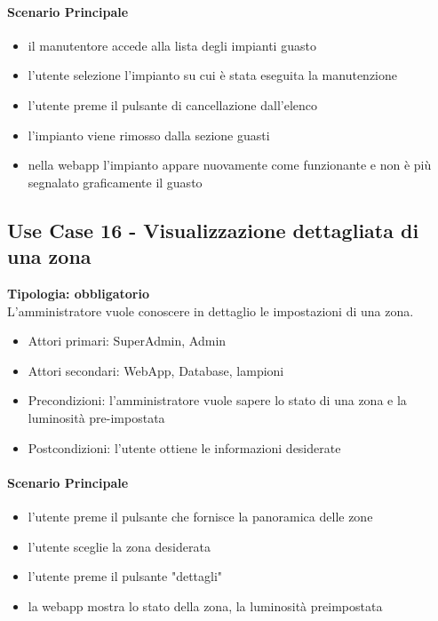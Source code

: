 \documentclass[12pt]{article}
\begin{document}
\paragraph{Scenario Principale}
\begin{itemize}
	\item il manutentore accede alla lista degli impianti guasto
	\item l'utente selezione l'impianto su cui è stata eseguita la manutenzione
	\item l'utente preme il pulsante di cancellazione dall'elenco
	\item l'impianto viene rimosso dalla sezione guasti
	\item nella webapp l'impianto appare nuovamente come funzionante e non è più segnalato graficamente il guasto
\end{itemize}

\subsection{Use Case 16 - Visualizzazione dettagliata di una zona}
\textbf{Tipologia: obbligatorio} \\
L'amministratore vuole conoscere in dettaglio le impostazioni di una zona.
\begin{itemize}
	\item Attori primari: SuperAdmin, Admin
	\item Attori secondari: WebApp, Database, lampioni
	\item Precondizioni: l'amministratore vuole sapere lo stato di una zona e la luminosità pre-impostata
	\item Postcondizioni: l'utente ottiene le informazioni desiderate
\end{itemize}
\paragraph{Scenario Principale}
\begin{itemize}
	\item l'utente preme il pulsante che fornisce la panoramica delle zone
	\item l'utente sceglie la zona desiderata
	\item l'utente preme il pulsante "dettagli"
	\item la webapp mostra lo stato della zona, la luminosità preimpostata
\end{itemize}
\end{document}
